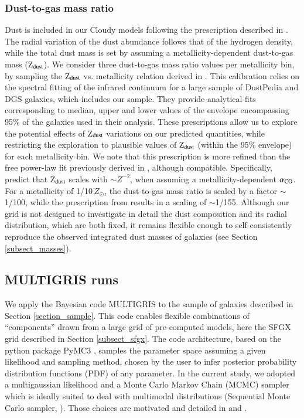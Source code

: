 \documentclass{aa}
\begin{document}
    
\subsubsection{Dust-to-gas mass ratio}
\label{subsec_dtg}

Dust is included in our Cloudy models following the prescription described in \cite{Ramambason2022}. The radial variation of the dust abundance follows that of the hydrogen density, while the total dust mass is set by assuming a metallicity-dependent dust-to-gas mass (Z$_{\rm dust}$).
We consider three dust-to-gas mass ratio values per metallicity bin, by sampling the Z$_{\rm dust}$ vs. metallicity relation derived in \cite{galliano_nearby_2021}. This calibration relies on the spectral fitting of the infrared continuum for a large sample of DustPedia \citep{Davies_dustpedia_2017} and DGS galaxies, which includes our sample. They provide analytical fits corresponding to median, upper and lower values of the envelope encompassing 95\% of the galaxies used in their analysis. These prescriptions allow us to explore the potential effects of  Z$_{\rm dust}$ variations on our predicted quantities, while restricting the exploration to plausible values of Z$_{\rm dust}$ (within the 95\% envelope) for each metallicity bin. We note that this prescription is more refined than the free power-law fit previously derived in \cite{Remy-Ruyer_2013}, although compatible. Specifically, \cite{Remy-Ruyer_2013} predict that Z$_{\rm dust}$ scales with $\sim Z^{-2}$, when assuming a metallicity-dependent $\alpha_{\rm CO}$. For a metallicity of 1/10\,$Z_{\odot}$, the dust-to-gas mass ratio is scaled by a factor $\sim$1/100, while the prescription from \cite{galliano_nearby_2021} results in a scaling of $\sim$1/155. 
Although our grid is not designed to investigate in detail the dust composition and its radial distribution, which are both fixed, it remains flexible enough to self-consistently reproduce the observed integrated dust masses of galaxies (see Section \ref{subsect_masses}).

\subsection{MULTIGRIS runs}
\label{subsect_mgris_config}

We apply the Bayesian code MULTIGRIS \citep{MULTIGRIS2022} to the sample of galaxies described in Section \ref{section_sample}. This code enables flexible combinations of “components” drawn from a large grid of pre-computed models, here the SFGX grid described in Section \ref{subsect_sfgx}. The code architecture, based on the python package PyMC3 \citep{pymc3_paper, PyMC3}, samples the parameter space assuming a given likelihood and sampling method, chosen by the user to infer posterior probability distribution functions (PDF) of any parameter. In the current study, we adopted a multigaussian likelihood and a Monte Carlo Markov Chain (MCMC) sampler which is ideally suited to deal with multimodal distributions (Sequential Monte Carlo sampler, \citealt{Minson_2013,Ching_2007}). Those choices are motivated and detailed in \cite{LebouteillerRamambason2022} and \cite{Ramambason2022}.
\end{document}
